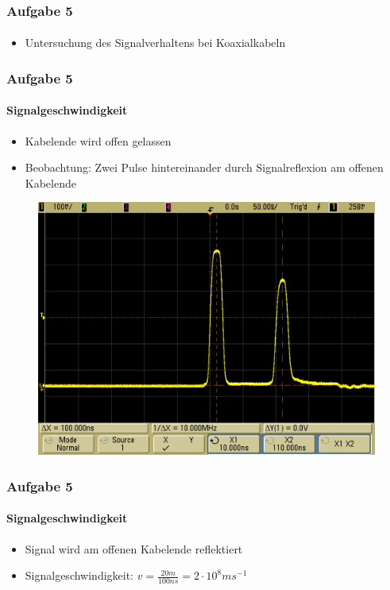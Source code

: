 \begin{frame}
    \frametitle{Aufgabe 5}
    \framesubtitle{}
    \begin{itemize}
        \item Untersuchung des Signalverhaltens bei Koaxialkabeln
    \end{itemize}
\end{frame}
\begin{frame}
    \frametitle{Aufgabe 5}
    \framesubtitle{Signalgeschwindigkeit}
    \begin{itemize}
        \item Kabelende wird offen gelassen
        \item Beobachtung: Zwei Pulse hintereinander durch Signalreflexion am
        offenen Kabelende
    \end{itemize}
    \begin{figure}[H]
    \begin{center}
            \includegraphics[scale=0.2]{./img/5a.png}
    \end{center}
    \end{figure}
\end{frame}
\begin{frame}
    \frametitle{Aufgabe 5}
    \framesubtitle{Signalgeschwindigkeit}
    \begin{itemize}
        \item Signal wird am offenen Kabelende reflektiert
        \item Signalgeschwindigkeit: $ v = \frac{20m}{100ns}=2 \cdot 10^8
        ms^{-1}$
    \end{itemize}
\end{frame}
